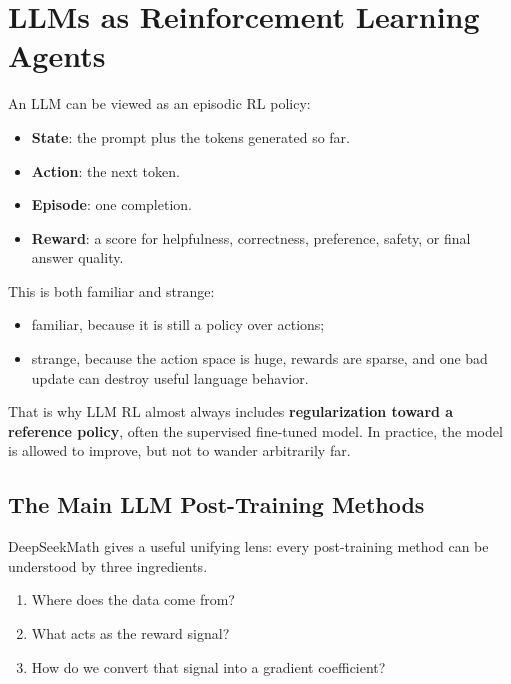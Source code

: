 \documentclass[11pt]{article}
\begin{document}
  \section{LLMs as Reinforcement Learning Agents}

  An LLM can be viewed as an episodic RL policy:

  \begin{itemize}
    \item \textbf{State}: the prompt plus the tokens generated so far.
    \item \textbf{Action}: the next token.
    \item \textbf{Episode}: one completion.
    \item \textbf{Reward}: a score for helpfulness, correctness, preference, safety, or final answer quality.
  \end{itemize}

  This is both familiar and strange:

  \begin{itemize}
    \item familiar, because it is still a policy over actions;
    \item strange, because the action space is huge, rewards are sparse, and one bad update can destroy useful language behavior.
  \end{itemize}

  That is why LLM RL almost always includes \textbf{regularization toward a reference policy}, often the supervised fine-tuned model. In practice, the model is allowed to improve, but not to wander arbitrarily far.

  \subsection{The Main LLM Post-Training Methods}

  DeepSeekMath gives a useful unifying lens: every post-training method can be understood by three ingredients.

  \begin{enumerate}
    \item Where does the data come from?
    \item What acts as the reward signal?
    \item How do we convert that signal into a gradient coefficient? 
  \end{enumerate}
\end{document}
